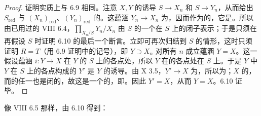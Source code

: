 \begin{proof}
证明实质上与 6.9 相同。注意 $X,Y$ 的诱导 $S\to X_n$ 和 $S\to Y_n$，从而给出 $S_{\mathrm{red}}$ 与 $(X_n)_{\mathrm{red}}$、$(Y_n)_{\mathrm{red}}$ 的。这蕴涵 $Y_n\to X_n$ 为，因而作为的，它是。所以由已用过的 VIII 6.4，$\prod_{X_n/S}Y_n/X_n$ 由 $S$ 的一个在 $S$ 上的闭子表示；于是只须在再假设 $S$ 时证明 6.10 的最后一个断言。立即可再次归结到 $S$ 的情形，这时只须证明 $R=T$（用 6.9 证明中的记号），即 $Y\supset X_n$ 对所有 $n$ 成立蕴涵 $Y=X$。这一假设蕴涵 $i:Y\to X$ 在 $Y$ 的 $S$ 上的各点处，所以 $Y$ 在的各点处在 $S$ 上。于是 $Y$ 中 $Y$ 在 $S$ 上的各点构成的 $Y'$ 是 $Y$ 的诱导。由 X 3.5，$Y'\to X$ 为，所以为；$X$ 的，而的任一也是闭的，故这是一个的，即。因此 $Y'=X$，从而 $Y=X$。6.10 证毕。
\end{proof}
像 VIII 6.5 那样，由 6.10 得到：
